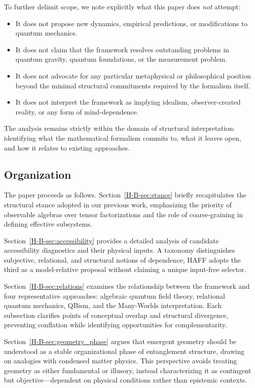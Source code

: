 \documentclass[12pt,a4paper,openany]{book}
\begin{document}
To further delimit scope, we note explicitly what this paper does \emph{not} attempt:

\begin{itemize}
\item It does not propose new dynamics, empirical predictions, or modifications to quantum mechanics.
\item It does not claim that the framework resolves outstanding problems in quantum gravity, quantum foundations, or the measurement problem.
\item It does not advocate for any particular metaphysical or philosophical position beyond the minimal structural commitments required by the formalism itself.
\item It does not interpret the framework as implying idealism, observer-created reality, or any form of mind-dependence.
\end{itemize}

The analysis remains strictly within the domain of structural interpretation: identifying what the mathematical formalism commits to, what it leaves open, and how it relates to existing approaches.

\subsection{Organization}

The paper proceeds as follows. Section~\ref{H-B-sec:stance} briefly recapitulates the structural stance adopted in our previous work, emphasizing the priority of observable algebras over tensor factorizations and the role of coarse-graining in defining effective subsystems. 

Section~\ref{H-B-sec:accessibility} provides a detailed analysis of candidate accessibility diagnostics and their physical inputs. A taxonomy distinguishes subjective, relational, and structural notions of dependence; HAFF adopts the third as a model-relative proposal without claiming a unique input-free selector.

Section~\ref{H-B-sec:relations} examines the relationship between the framework and four representative approaches: algebraic quantum field theory, relational quantum mechanics, QBism, and the Many-Worlds interpretation. Each subsection clarifies points of conceptual overlap and structural divergence, preventing conflation while identifying opportunities for complementarity.

Section~\ref{H-B-sec:geometry_phase} argues that emergent geometry should be understood as a stable organizational phase of entanglement structure, drawing on analogies with condensed matter physics. This perspective avoids treating geometry as either fundamental or illusory, instead characterizing it as contingent but objective—dependent on physical conditions rather than epistemic contexts.
\end{document}
